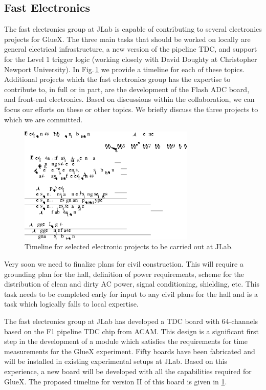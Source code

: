 \documentclass[oneside,12pt,letterpaper]{article}
\begin{document}
\subsection{Fast Electronics}
The fast electronics group at JLab is capable of contributing to
several electronics projects for GlueX. The three main tasks that
should be worked on locally are general electrical
infrastructure, a new version of the pipeline TDC, and support for
the Level 1 trigger logic (working closely with David Doughty at
Christopher Newport University). In Fig.\,\ref{fig:electronics_timeline} we
provide a timeline for each of these topics. Additional projects which
the fast electronics group has the expertise to contribute to, in full or in part,
are the development of the Flash ADC board, and front-end electronics.
Based on discussions within the collaboration, we can focus our
efforts on these or other topics. We briefly discuss the three projects
to which we are committed.

\begin{figure}[h!]\centering
\includegraphics[width=0.75\textwidth]{electronics_timeline.pdf}
\caption[]{\label{fig:electronics_timeline}
Timeline for selected electronic projects to be carried out at JLab.}
\end{figure}

Very soon we need to finalize plans for civil construction. This will
require a grounding plan for the hall, definition of power 
requirements, scheme for the distribution of
clean and dirty AC power, signal conditioning, shielding, etc. This task
needs to be completed early for input to any civil plans for the hall
and is a task which logically falls to local expertise.

The fast electronics group at JLab has developed a TDC board with
64-channels based on the F1 pipeline TDC chip from ACAM. This design
is a significant first step in the development of a module which
satisfies the requirements for time measurements for the GlueX 
experiment. Fifty boards have been fabricated and will be installed
in existing experimental setups at JLab. Based on this experience,
a new board will be developed with all the capabilities required for
GlueX. The proposed timeline for version II of this board is given
in \ref{fig:electronics_timeline}.
\end{document}
